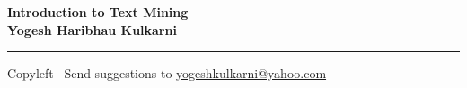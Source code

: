 
\graphicspath{{images/}}

\footnotesize


\begin{center}
\Large{\textbf{Introduction to Text Mining\\ Yogesh Haribhau Kulkarni}}  
\end{center}

\begin{multicols}{2}

\end{multicols}

\rule{\linewidth}{0.25pt}
\scriptsize
Copyleft \textcopyleft\  Send suggestions to 
\href{http://www.yogeshkulkarni.com}{yogeshkulkarni@yahoo.com}


